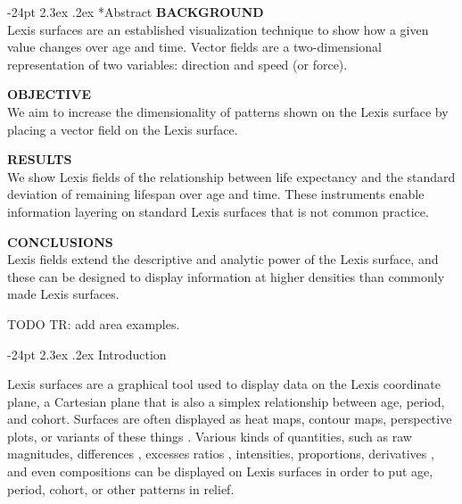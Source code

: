 \documentclass[10pt, twoside, parskip=half]{article}
\title{\large\textbf{Lexis Fields}\vskip 0em}
\author{\normalsize\textrm{\textbf{(authors redacted)}}}
\date{\vspace{-5ex}}
\makeatletter
\renewcommand\section{\@startsection {section}{1}{\z@}%
                                   {-24pt}%
                                   {2.3ex \@plus.2ex}%
                                   {\normalfont\large\bfseries}}
\makeatother
\begin{document}
  \maketitle

\vspace*{-24pt}
\vspace*{5mm}
\setlength{\parskip}{0.5em}
\section*{Abstract}
  \noindent\textbf{BACKGROUND}\\
  Lexis surfaces are an established visualization technique to show how a given value changes over age and time. Vector fields are a two-dimensional representation of two variables: direction and speed (or force).
  \par
  \noindent\textbf{OBJECTIVE}\\
  We aim to increase the dimensionality of patterns shown on the Lexis surface by placing a vector field on the Lexis surface.
  \par
  \noindent\textbf{RESULTS}\\
  We show Lexis fields of the relationship between life expectancy and the standard deviation of remaining lifespan over age and time. These instruments enable information layering on standard Lexis surfaces that is not common practice.
  \par
  \noindent\textbf{CONCLUSIONS}\\
  Lexis fields extend the descriptive and analytic power of the Lexis surface, and these can be designed to display information at higher densities than commonly made Lexis surfaces.
  \par
\vspace*{12pt}

\setlength{\parskip}{0ex}

\newpage

TODO TR: add area examples.

\hypertarget{introduction}{%
\section{Introduction}\label{introduction}}

Lexis surfaces are a graphical tool used to display data on the Lexis coordinate plane, a Cartesian plane that is also a simplex relationship between age, period, and cohort. Surfaces are often displayed as heat maps, contour maps, perspective plots, or variants of these things \citep{vaupel1987thousands}. Various kinds of quantities, such as raw magnitudes, differences \citep{minton2017visualising}, excesses \citep[\citet{acosta2019apc}]{remund2018cause} ratios \citep{canudas2005age}, intensities, proportions, derivatives \citep{rau2017visualizing}, and even compositions \citep{scholey2017visualizing} can be displayed on Lexis surfaces in order to put age, period, cohort, or other patterns in relief.
\end{document}
